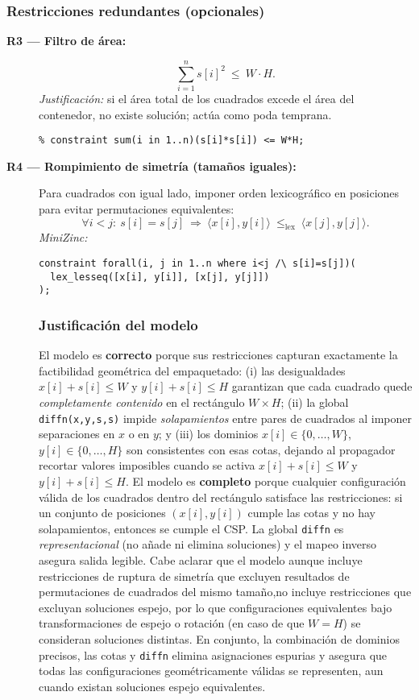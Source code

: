 \subsubsection*{Restricciones redundantes (opcionales)}
\begin{description}
  \item[\textbf{R3 — Filtro de área:}]
  \[
  \sum_{i=1}^{n} s[i]^2 \ \le\ W\cdot H.
  \]
  \textit{Justificación:} si el área total de los cuadrados excede el área del contenedor, no existe solución; actúa como poda temprana.
\begin{verbatim}
% constraint sum(i in 1..n)(s[i]*s[i]) <= W*H;
\end{verbatim}

  \item[\textbf{R4 — Rompimiento de simetría (tamaños iguales):}] Para cuadrados con igual lado, imponer orden lexicográfico en posiciones para evitar permutaciones equivalentes:
\[
\forall i<j:\ s[i]=s[j]\ \Rightarrow\ \langle x[i],y[i]\rangle\ \le_{\text{lex}}\ \langle x[j],y[j]\rangle.
\]
\textit{MiniZinc:}
\begin{verbatim}
constraint forall(i, j in 1..n where i<j /\ s[i]=s[j])(
  lex_lesseq([x[i], y[i]], [x[j], y[j]])
);
\end{verbatim}

\subsubsection*{Justificación del modelo}
El modelo es \textbf{correcto} porque sus restricciones capturan exactamente la factibilidad geométrica del empaquetado: (i) las desigualdades
\(x[i]+s[i]\le W\) y \(y[i]+s[i]\le H\) garantizan que cada cuadrado quede \emph{completamente contenido} en el rectángulo \(W\times H\); (ii) la global \texttt{diffn(x,y,s,s)} impide \emph{solapamientos} entre pares de cuadrados al imponer separaciones en \(x\) o en \(y\); y (iii) los dominios \(x[i]\in\{0,\dots,W\}\), \(y[i]\in\{0,\dots,H\}\) son consistentes con esas cotas, dejando al propagador recortar valores imposibles cuando se activa \(x[i]+s[i]\le W\) y \(y[i]+s[i]\le H\). El modelo es \textbf{completo} porque cualquier configuración válida de los cuadrados dentro del rectángulo satisface las restricciones: si un conjunto de posiciones \((x[i],y[i])\) cumple las cotas y no hay solapamientos, entonces se cumple el CSP. La global \texttt{diffn} es \emph{representacional} (no añade ni elimina soluciones) y el mapeo inverso asegura salida legible. Cabe aclarar que el modelo aunque incluye restricciones de ruptura de simetría que excluyen resultados de permutaciones de cuadrados del mismo tamaño,no incluye restricciones que excluyan soluciones espejo, por lo que configuraciones equivalentes bajo transformaciones de espejo o rotación (en caso de que \(W = H\)) se consideran soluciones distintas. En conjunto, la combinación de dominios precisos, las cotas y \texttt{diffn} elimina asignaciones espurias y asegura que todas las configuraciones geométricamente válidas se representen, aun cuando existan soluciones espejo equivalentes.
\end{description}